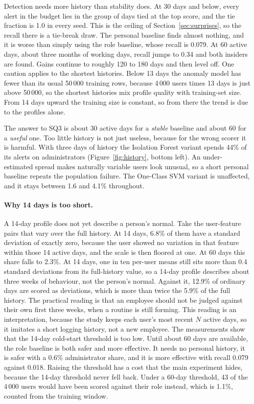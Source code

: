 \documentclass[a4paper,12pt]{article}
\begin{document}
Detection needs more history than stability does. At 30 days and below, every alert in the budget lies in the group of days tied at the top score, and the tie fraction is 1.0 in every seed. This is the ceiling of Section~\ref{sec:surprises}, so the recall there is a tie-break draw. The personal baseline finds almost nothing, and it is worse than simply using the role baseline, whose recall is 0.079. At 60 active days, about three months of working days, recall jumps to 0.34 and both insiders are found. Gains continue to roughly 120 to 180 days and then level off. One caution applies to the shortest histories. Below 13 days the anomaly model has fewer than its usual 50\,000 training rows, because 4\,000 users times 13 days is just above 50\,000, so the shortest histories mix profile quality with training-set size. From 14 days upward the training size is constant, so from there the trend is due to the profiles alone.

The answer to SQ3 is about 30 active days for a \emph{stable} baseline and about 60 for a \emph{useful} one. Too little history is not just useless, because for the wrong scorer it is harmful. With three days of history the Isolation Forest variant spends 44\% of its alerts on administrators (Figure~\ref{fig:history}, bottom left). An under-estimated spread makes naturally variable users look unusual, so a short personal baseline repeats the population failure. The One-Class SVM variant is unaffected, and it stays between 1.6 and 4.1\% throughout.

\paragraph{Why 14 days is too short.} A 14-day profile does not yet describe a person's normal. Take the user-feature pairs that vary over the full history. At 14 days, 6.8\% of them have a standard deviation of exactly zero, because the user showed no variation in that feature within those 14 active days, and the scale is then floored at one. At 60 days this share falls to 2.3\%. At 14 days, one in ten per-user means still sits more than 0.4 standard deviations from its full-history value, so a 14-day profile describes about three weeks of behaviour, not the person's normal. Against it, 12.9\% of ordinary days are scored as deviations, which is more than twice the 5.9\% of the full history. The practical reading is that an employee should not be judged against their own first three weeks, when a routine is still forming. This reading is an interpretation, because the study keeps each user's most recent $N$ active days, so it imitates a short logging history, not a new employee. The measurements show that the 14-day cold-start threshold is too low. Until about 60 days are available, the role baseline is both safer and more effective. It needs no personal history, it is safer with a 0.6\% administrator share, and it is more effective with recall 0.079 against 0.018. Raising the threshold has a cost that the main experiment hides, because the 14-day threshold never fell back. Under a 60-day threshold, 43 of the 4\,000 users would have been scored against their role instead, which is 1.1\%, counted from the training window.
\end{document}
